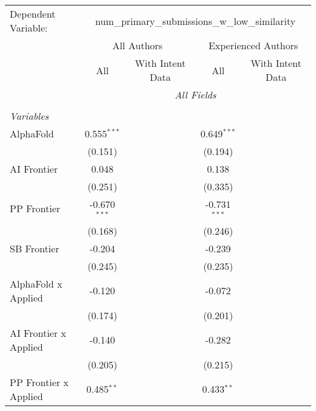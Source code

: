 \begingroup
\centering
\begin{tabular}{lcccccc}
   \tabularnewline \midrule \midrule
   Dependent Variable: & \multicolumn{6}{c}{num\_primary\_submissions\_w\_low\_similarity}\\
 & \multicolumn{3}{c}{All Authors} & \multicolumn{3}{c}{Experienced Authors} \\
\cmidrule(lr){2-4} \cmidrule(lr){5-7}
 & \multicolumn{1}{c}{All} & \multicolumn{2}{c}{With Intent Data} & \multicolumn{1}{c}{All} & \multicolumn{2}{c}{With Intent Data} \\
\cmidrule(lr){2-2} \cmidrule(lr){3-4} \cmidrule(lr){5-5} \cmidrule(lr){6-7}
 & \multicolumn{6}{c}{\textit{All Fields}} \\ \\
   \emph{Variables}\\
   AlphaFold             & 0.555$^{***}$  &         &         & 0.649$^{***}$  &         &   \\   
                         & (0.151)        &         &         & (0.194)        &         &   \\   
   AI Frontier           & 0.048          &         &         & 0.138          &         &   \\   
                         & (0.251)        &         &         & (0.335)        &         &   \\   
   PP Frontier           & -0.670$^{***}$ &         &         & -0.731$^{***}$ &         &   \\   
                         & (0.168)        &         &         & (0.246)        &         &   \\   
   SB Frontier           & -0.204         &         &         & -0.239         &         &   \\   
                         & (0.245)        &         &         & (0.235)        &         &   \\   
   AlphaFold x Applied   & -0.120         &         &         & -0.072         &         &   \\   
                         & (0.174)        &         &         & (0.201)        &         &   \\   
   AI Frontier x Applied & -0.140         &         &         & -0.282         &         &   \\   
                         & (0.205)        &         &         & (0.215)        &         &   \\   
   PP Frontier x Applied & 0.485$^{**}$   &         &         & 0.433$^{**}$   &         &   \\   

\end{tabular}
